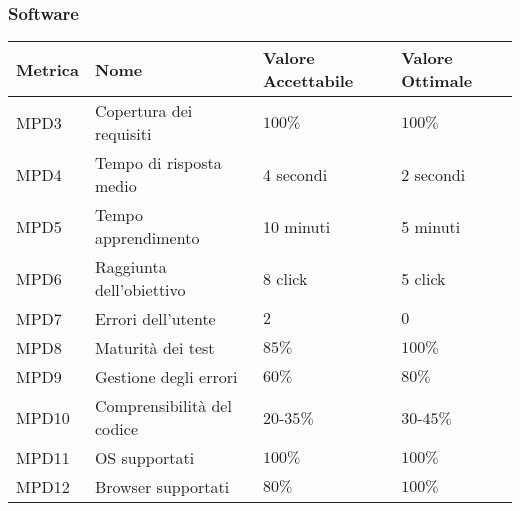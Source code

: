 \subsubsection{Software}
\begin{center}
  \begin{tabular}{|p{1.8cm}|p{4.5cm}|p{2.8cm}|p{3.5cm}|} \hline
    \textbf{Metrica} & \textbf{Nome} & \textbf{Valore Accettabile} & \textbf{Valore Ottimale}    \\ \hline
      MPD3 & Copertura dei requisiti & $100\%$ & $100\%$  \\ \hline
      MPD4 & Tempo di risposta medio    &  4 secondi  &  2 secondi   \\ \hline
      MPD5 & Tempo apprendimento    & 10 minuti  & 5 minuti       \\ \hline
      MPD6 & Raggiunta dell'obiettivo    & 8 click   & 5 click     \\ \hline
      MPD7 & Errori dell'utente    & $2$      & $0$        \\ \hline
      MPD8 & Maturità dei test    & $85\%$ &  $100\%$    \\ \hline
      MPD9 & Gestione degli errori    & $60\%$ & $80\%$     \\ \hline
      MPD10 & Comprensibilità del codice    & $20$-$35\%$ & $30$-$45\%$     \\ \hline
      MPD11 & OS supportati    & $100\%$ & $100\%$     \\ \hline
      MPD12 & Browser supportati    & $80\%$ & $100\%$     \\ \hline
  \end{tabular}
\end{center}

